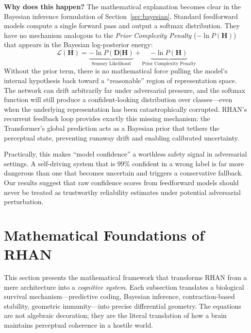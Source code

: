 \documentclass[12pt,a4paper]{article}
\begin{document}
\textbf{Why does this happen?} The mathematical explanation becomes clear
in the Bayesian inference formulation of Section~\ref{sec:bayesian}.
Standard feedforward models compute a single forward pass and output a
softmax distribution. They have no mechanism analogous to the
\textit{Prior Complexity Penalty} ($-\ln P(\mathbf{H})$) that appears in
the Bayesian log-posterior energy:
\begin{equation}
  \mathcal{L}(\mathbf{H}) = \underbrace{-\ln P(\mathbf{D}|\mathbf{H})}_{\text{Sensory Likelihood}} + \underbrace{-\ln P(\mathbf{H})}_{\text{Prior Complexity Penalty}}
\end{equation}
Without the prior term, there is no mathematical force pulling the model's
internal hypothesis back toward a ``reasonable'' region of representation
space. The network can drift arbitrarily far under adversarial pressure,
and the softmax function will still produce a confident-looking distribution
over classes---even when the underlying representation has been catastrophically
corrupted. RHAN's recurrent feedback loop provides exactly this missing
mechanism: the Transformer's global prediction acts as a Bayesian prior
that tethers the perceptual state, preventing runaway drift and enabling
calibrated uncertainty.

Practically, this makes ``model confidence'' a worthless safety signal in
adversarial settings. A self-driving system that is 99\% confident in a
wrong label is far more dangerous than one that becomes uncertain and
triggers a conservative fallback. Our results suggest that raw confidence
scores from feedforward models should never be treated as trustworthy
reliability estimates under potential adversarial perturbation.


\section{Mathematical Foundations of RHAN}
\label{sec:math}

This section presents the mathematical framework that transforms RHAN from
a mere architecture into a \textit{cognitive system}. Each subsection
translates a biological survival mechanism---predictive coding, Bayesian
inference, contraction-based stability, geometric immunity---into precise
differential geometry. The equations are not algebraic decoration; they
are the literal translation of how a brain maintains perceptual coherence
in a hostile world.
\end{document}

